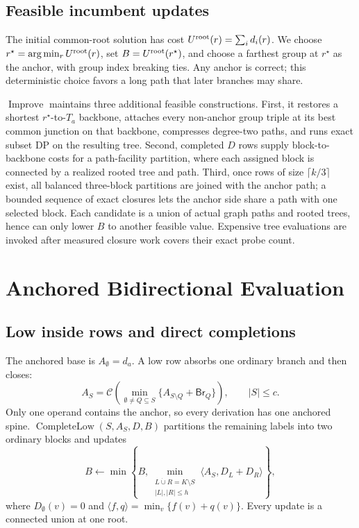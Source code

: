 \documentclass[sigconf,nonacm]{acmart}
\newcommand{\Clos}{\mathcal{C}}
\newcommand{\Br}{\mathsf{Br}}
\newcommand{\inner}[2]{\langle #1,#2\rangle}
\newcommand{\Improve}{\operatorname{Improve}}
\newcommand{\CompleteLow}{\operatorname{CompleteLow}}
\begin{document}
\subsection{Feasible incumbent updates}
\label{sec:upper}

The initial common-root solution has cost $U^{\rm root}(r)=\sum_i d_i(r)$.  We choose $r^\star=\arg\min_r U^{\rm root}(r)$, set $B=U^{\rm root}(r^\star)$, and choose a farthest group at $r^\star$ as the anchor, with group index breaking ties.  Any anchor is correct; this deterministic choice favors a long path that later branches may share.

$\Improve$ maintains three additional feasible constructions.  First, it restores a shortest $r^\star$-to-$T_a$ backbone, attaches every non-anchor group triple at its best common junction on that backbone, compresses degree-two paths, and runs exact subset DP on the resulting tree.  Second, completed $D$ rows supply block-to-backbone costs for a path-facility partition, where each assigned block is connected by a realized rooted tree and path.  Third, once rows of size $\lceil k/3\rceil$ exist, all balanced three-block partitions are joined with the anchor path; a bounded sequence of exact closures lets the anchor side share a path with one selected block.  Each candidate is a union of actual graph paths and rooted trees, hence can only lower $B$ to another feasible value.  Expensive tree evaluations are invoked after measured closure work covers their exact probe count.

\section{Anchored Bidirectional Evaluation}
\label{sec:anchored}

\subsection{Low inside rows and direct completions}
\label{sec:low}

The anchored base is $A_\emptyset=d_a$.  A low row absorbs one ordinary branch and then closes:
\begin{equation}
 A_S=\Clos\!\left(\min_{\emptyset\neq Q\subseteq S}
 \{A_{S\setminus Q}+\Br_Q\}\right),\qquad |S|\leq c.
 \label{eq:anchored}
\end{equation}
Only one operand contains the anchor, so every derivation has one anchored spine.  $\CompleteLow(S,A_S,D,B)$ partitions the remaining labels into two ordinary blocks and updates
\begin{equation}
 B\leftarrow\min\left\{B,
 \min_{\substack{L\mathbin{\dot\cup}R=K\setminus S\\|L|,|R|\leq h}}
 \inner{A_S}{D_L+D_R}\right\},
 \label{eq:complete}
\end{equation}
where $D_\emptyset(v)=0$ and $\inner{f}{q}=\min_v\{f(v)+q(v)\}$.  Every update is a connected union at one root.
\end{document}
